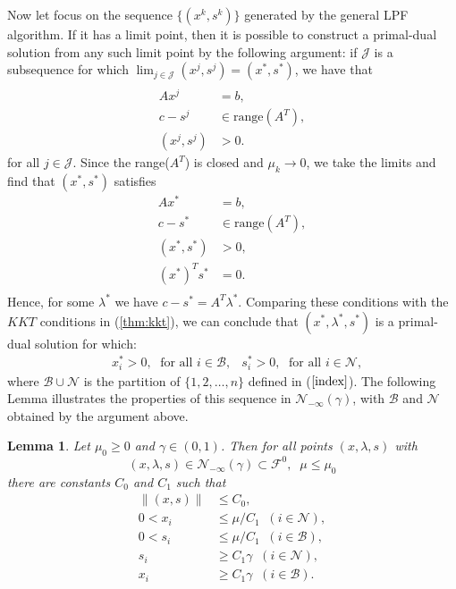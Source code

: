 \documentclass[a4paper,10 pt,titlepage,twoside]{report}
\theoremstyle{plain}
\newtheorem{lem}[thm]{Lemma}
\theoremstyle{definition}
\theoremstyle{remark}
\begin{document}
Now let focus on the sequence $\{(x^{k},s^{k})\}$ generated by the general LPF algorithm. If it has a limit point, then it is possible to construct a primal-dual solution from any such limit point by the following argument: if $\mathcal{J}$ is a subsequence for which $\lim_{j\in\mathcal{J}}(x^{j},s^{j})=(x^{*},s^{*})$, we have that
\begin{alignat*}
\\
Ax^{j}&= b,\\
c - s^{j}&\in\text{range}(A^{T}),\\ (x^{j},s^{j})&>0.
\end{alignat*}
 for all $j\in\mathcal{J}$. Since the range($A^{T}$) is closed and $\mu_{k}\to 0$, we take the limits and find that $(x^{*},s^{*})$ satisfies
\begin{align*}
Ax^{*}&= b,\\c-s^{*}&\in\text{range}(A^{T}),\\(x^{*},s^{*})&>0,\\(x^{*})^{T}s^{*}&=0.\\
\end{align*}
Hence, for some $\lambda^{*}$ we have $c-s^{*}= A^{T}\lambda^{*}$. Comparing these conditions with the $KKT$ conditions in (\ref{thm:kkt}), we can conclude that $(x^{*},\lambda^{*},s^{*})$ is a primal-dual solution for which:
\begin{align*}
&x^{*}_{i}>0,\; \text{ for all } i \in\mathcal{B},
&s^{*}_{i}>0,\; \text{ for all } i \in\mathcal{N},
\end{align*}
where $\mathcal{B}\cup\mathcal{N}$ is the partition of $\{1,2,\dots,n\}$ defined in ($\ref{index}$).
The following Lemma illustrates the properties of this sequence in $\mathcal{N}_{-\infty}(\gamma)$, with $\mathcal{B}$ and $\mathcal{N}$ obtained by the argument above.
\begin{lem}
	Let $\mu_{0}\geq 0$ and $\gamma\in(0,1)$. Then for all points $(x,\lambda,s)$ with
	\begin{equation*}
	(x,\lambda,s)\in\mathcal{N}_{-\infty}(\gamma)\subset\mathcal{F}^{0}, \;\; \mu \leq \mu_{0}
	\end{equation*}
	there are constants $C_{0}$ and $C_{1}$ such that
	\begin{align*}
	\lVert(x,s) \rVert&\leq C_{0},\tag{B}\label{B}\\0< x_{i}&\leq \mu/C_{1}\;\; (i \in\mathcal{N}),\\
	0< s_{i}&\leq \mu/C_{1}\;\; (i \in\mathcal{B}),\\ 
	s_{i}&\geq C_{1}\gamma \;\; (i \in\mathcal{N}),\\
	x_{i}&\geq C_{1}\gamma \;\; (i \in\mathcal{B}).\\
	\end{align*}
\end{lem}
\end{document}
